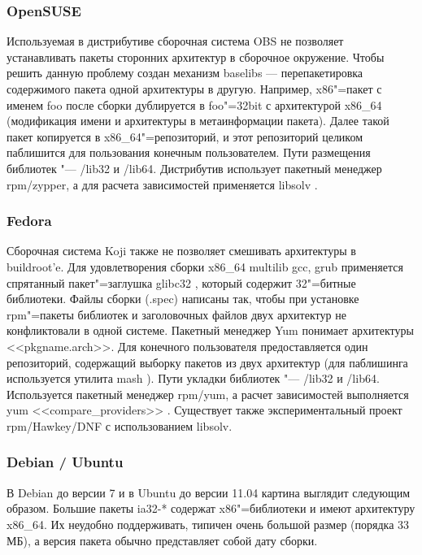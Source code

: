 \documentclass[10pt, a5paper]{article}
\begin{document}
\subsubsection*{OpenSUSE}

Используемая в дистрибутиве сборочная система OBS \cite{Sha1} не позволяет устанавливать пакеты сторонних архитектур в сборочное окружение. Чтобы решить данную проблему создан механизм baselibs \cite{Sha2} --- перепакетировка содержимого пакета одной архитектуры в другую. Например, x86"=пакет с именем foo после сборки дублируется в foo"=32bit с архитектурой x86\_64 (модификация имени и архитектуры в метаинформации пакета). Далее такой пакет копируется в x86\_64"=репозиторий, и этот репозиторий целиком паблишится для пользования конечным пользователем. Пути размещения библиотек "--- /lib32 и /lib64. Дистрибутив использует пакетный менеджер rpm/zypper, а для расчета зависимостей применяется libsolv \cite{Sha3}.

\subsubsection*{Fedora}

Сборочная система Koji \cite{Sha4} также не позволяет смешивать архитектуры в buildroot'e. Для удовлетворения сборки x86\_64 multilib gcc, grub применяется спрятанный пакет"=заглушка glibc32 \cite{Sha5}, который содержит 32"=битные библиотеки. Файлы сборки (.spec) написаны так, чтобы при установке rpm"=пакеты библиотек и заголовочных файлов двух архитектур не конфликтовали в одной системе. Пакетный менеджер Yum понимает архитектуры <<pkgname.arch>>. Для конечного пользователя предоставляется один репозиторий, содержащий выборку пакетов из двух архитектур  (для паблишинга используется утилита mash \cite{Sha6}). Пути укладки библиотек "---  /lib32 и /lib64. Используется пакетный менеджер rpm/yum, а расчет зависимостей выполняется yum <<compare\_providers>> \cite{Sha7}. Существует также экспериментальный проект rpm/Hawkey/DNF с использованием libsolv.

\subsubsection*{Debian / Ubuntu}

В Debian до версии 7 и в Ubuntu до версии 11.04 картина выглядит следующим образом. Большие пакеты ia32-* \cite{Sha8} содержат x86"=библиотеки и имеют архитектуру x86\_64. Их неудобно поддерживать, типичен очень большой размер (порядка 33 МБ), а версия пакета обычно представляет собой дату сборки.
\end{document}
